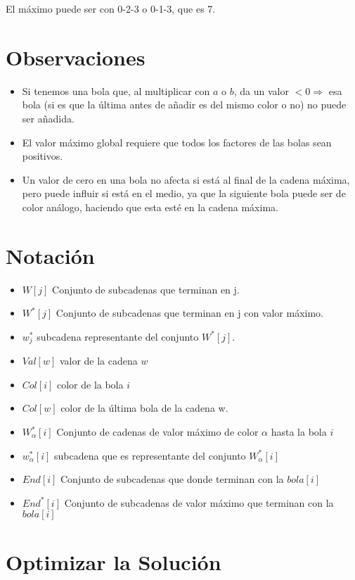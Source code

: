 \documentclass{article}
\begin{document}
El máximo puede ser con 0-2-3 o 0-1-3, que es 7.

\section*{Observaciones}
\begin{itemize}
    \item Si tenemos una bola que, al multiplicar con $a$ o $b$, da un valor $< 0 \Rightarrow$ esa bola (si es que la última antes de añadir es del mismo color o no) no puede ser añadida.
    \item El valor máximo global requiere que todos los factores de las bolas sean positivos.
    \item Un valor de cero en una bola no afecta si está al final de la cadena máxima, pero puede influir si está en el medio, ya que la siguiente bola puede ser de color análogo, haciendo que esta esté en la cadena máxima.
\end{itemize}


\section*{Notación}
\begin{itemize} 
  \item $W[j]$ Conjunto de subcadenas que terminan en j.
  \item $W^*[j]$ Conjunto de subcadenas que terminan en j con valor máximo.
  \item $w^*_j$ subcadena representante del conjunto $W^*[j]$.
  \item $Val[w]$ valor de la cadena $w$
  \item $Col[i]$ color de la bola $i$
  \item $Col[w]$ color de la última bola de la cadena w.
  \item $W^*_\alpha[i]$ Conjunto de cadenas de valor máximo de color $\alpha$ hasta la bola $i$
  \item $w^*_\alpha[i]$ subcadena que es representante del conjunto $W^*_\alpha[i]$ 
  \item $End[i]$ Conjunto de subcadenas que donde terminan con la $bola[i]$
  \item $End^*[i]$ Conjunto de  subcadenas de valor máximo que terminan con la  $bola[i]$
  
\end{itemize}

\section*{Optimizar la Solución}
 
\end{document}
